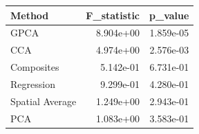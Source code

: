 \begin{tabular}{lrr}
\toprule
Method & F_statistic & p_value \\
\midrule
GPCA & 8.904e+00 & 1.859e-05 \\
CCA & 4.974e+00 & 2.576e-03 \\
Composites & 5.142e-01 & 6.731e-01 \\
Regression & 9.299e-01 & 4.280e-01 \\
Spatial Average & 1.249e+00 & 2.943e-01 \\
PCA & 1.083e+00 & 3.583e-01 \\
\bottomrule
\end{tabular}
